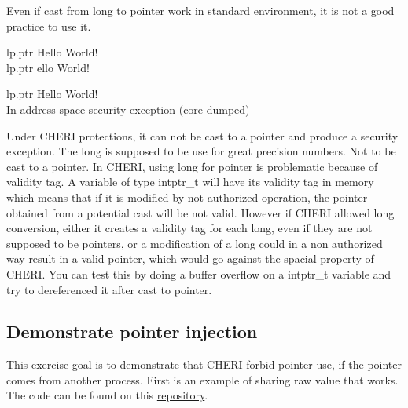 \documentclass[a4paper, 11pt]{article}
\newcommand{\cmark}{\ding{51}}
\newcommand{\xmark}{\ding{55}}
\begin{document}
	
		Even if cast from long to pointer work in standard environment, it is not a good practice to use it.
		\begin{tcolorbox}[colback=gray!5!white, colframe=gray!75!black, title=Output on classic \Gls{risc-v} environment (No CHERI protection)]
			lp.ptr Hello World!\\
			lp.ptr ello World!
		\end{tcolorbox}
		\begin{tcolorbox}[colback=gray!5!white, colframe=blue!75!black, title=Execution on CHERI environment]
			lp.ptr Hello World!\\
			In-address space security exception (core dumped)
		\end{tcolorbox}
		Under CHERI protections, it can not be cast to a pointer and produce a security exception.
		The long is supposed to be use for great precision numbers. Not to be cast to a pointer.
		In CHERI, using long for pointer is problematic because of validity tag. A variable of type intptr\_t will have its validity tag in memory which means that if it is modified by not authorized operation, the pointer obtained from a potential cast will be not valid.
		However if CHERI allowed long conversion, either it creates a validity tag for each long, even if they are not supposed to be pointers, or a modification of a long could in a non authorized way result in a valid pointer, which would go against the spacial property of CHERI.
		You can test this by doing a buffer overflow on a intptr\_t variable and try to dereferenced it after cast to pointer.
	
	\subsection{Demonstrate pointer injection}
		This exercise goal is to demonstrate that CHERI forbid pointer use, if the pointer comes from another process.
		First is an example of sharing raw value that works. The code can be found on this \href{https://ctsrd-cheri.github.io/cheri-exercises/exercises/pointer-injection/index.html}{repository}.
	
	
	
\end{document}
